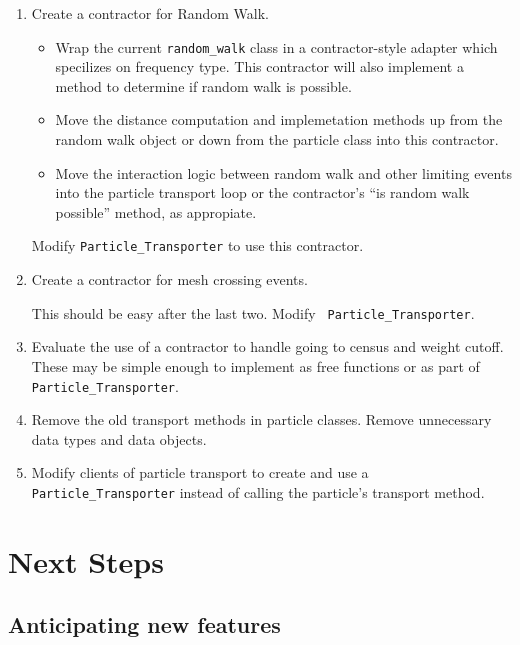 \documentclass[memo]{ResearchNote}
\begin{document}
\begin{enumerate}
  \item Create a contractor for Random Walk. 

    \begin{itemize}
    \item Wrap the current {\tt random\_walk} class in a
      contractor-style adapter which specilizes on frequency
      type. This contractor will also implement a method to determine
      if random walk is possible.
    \item Move the distance computation and implemetation methods up
      from the random walk object or down from the particle class into
      this contractor.
    \item Move the interaction logic between random walk and other
      limiting events into the particle transport loop or the
      contractor's ``is random walk possible'' method, as appropiate.
    \end{itemize}

    Modify {\tt Particle\_Transporter} to use this contractor.
    
  \item Create a contractor for mesh crossing events.
    
    This should be easy after the last two. Modify {\tt
      Particle\_Transporter}.

  \item Evaluate the use of a contractor to handle going to census and
    weight cutoff. These may be simple enough to implement as free
    functions or as part of {\tt Particle\_Transporter}.
    
  \item Remove the old transport methods in particle classes. Remove
    unnecessary data types and data objects.
    
  \item Modify clients of particle transport to create and use a {\tt
      Particle\_Transporter} instead of calling the particle's
    transport method.

\end{enumerate}

\section{Next Steps}

\subsection{Anticipating new features}
\end{document}
